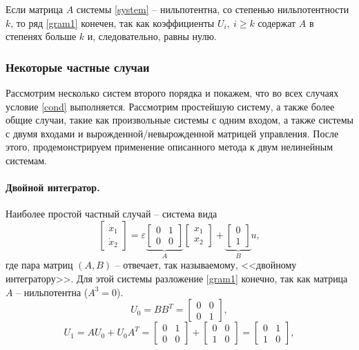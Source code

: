 \documentclass[../main.tex]{subfiles}
\begin{document}
Если матрица $ A $ системы \eqref{system} -- нильпотентна, со степенью нильпотентности $ k $, то ряд \eqref{gram1} конечен, так как коэффициенты $ U_i, \ i \geq k$ содержат $ A $ в степенях больше $ k$ и, следовательно, равны нулю.  
\subsubsection{Некоторые частные случаи}
Рассмотрим несколько систем второго порядка и покажем, что во всех случаях условие \eqref{cond} выполняется. Рассмотрим простейшую систему, а также более общие случаи, такие как произвольные системы с одним входом, а также системы с двумя входами и вырожденной/невырожденной матрицей управления. После этого, продемонстрируем применение описанного метода к двум нелинейным системам.
\paragraph{Двойной интегратор.}
Наиболее простой частный случай -- система вида 
\begin{equation*}
	\left[ {\begin{array}{*{20}{c}}
			{{{\dot x}_1}}\\
			{{{\dot x}_2}}
	\end{array}} \right] = \varepsilon \underbrace {\left[ {\begin{array}{*{20}{c}}
				0&1\\
				0&0
		\end{array}} \right]}_A\left[ {\begin{array}{*{20}{c}}
			{{x_1}}\\
			{{x_2}}
	\end{array}} \right] + \underbrace {\left[ {\begin{array}{*{20}{c}}
				0\\
				1
		\end{array}} \right]}_Bu,
\end{equation*}
где пара матриц $ (A,B) $ -- отвечает, так называемому, <<двойному интегратору>>.
Для этой системы разложение \eqref{gram1} конечно, так как матрица $ A $ -- нильпотентна ($ A^3 = 0$).
\begin{equation*}
	U_0 = B B^T =  \left[ {\begin{array}{*{20}{c}}
			0&0\\
			0&1
	\end{array}}\right],
\end{equation*}
\begin{equation*}
	U_1 = A U_0 + U_0 A^T = \left[ {\begin{array}{*{20}{c}}
			0&1\\
			0&0
	\end{array}}\right] + \left[ {\begin{array}{*{20}{c}}
			0&0\\
			1&0
	\end{array}}\right] = \left[ {\begin{array}{*{20}{c}}
			0&1\\
			1&0
	\end{array}}\right],
\end{equation*}
\end{document}
